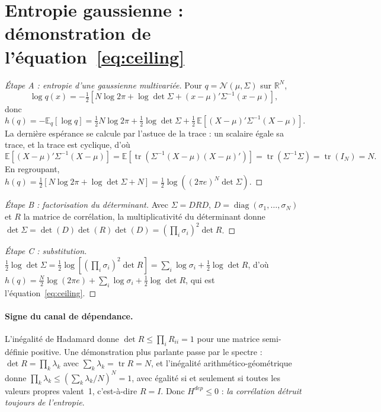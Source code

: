 \documentclass[11pt]{article}
\theoremstyle{definition}
\theoremstyle{remark}
\begin{document}
\section{Entropie gaussienne : démonstration de l'équation~\eqref{eq:ceiling}}
\label{app:gauss}

\begin{proof}[Étape A : entropie d'une gaussienne multivariée]
Pour $q=\mathcal N(\mu,\Sigma)$ sur $\mathbb{R}^N$,
\[
\log q(x) = -\tfrac12\left[N\log 2\pi + \log\det\Sigma + (x-\mu)'\Sigma^{-1}(x-\mu)\right],
\]
donc
\[
h(q) = -\mathbb{E}_q[\log q] = \tfrac12 N\log 2\pi + \tfrac12\log\det\Sigma
+ \tfrac12\,\mathbb{E}\!\left[(X-\mu)'\Sigma^{-1}(X-\mu)\right].
\]
La dernière espérance se calcule par l'astuce de la trace : un scalaire égale sa
trace, et la trace est cyclique, d'où
\[
\mathbb{E}\!\left[(X-\mu)'\Sigma^{-1}(X-\mu)\right]
= \mathbb{E}\!\left[\operatorname{tr}\!\left(\Sigma^{-1}(X-\mu)(X-\mu)'\right)\right]
= \operatorname{tr}(\Sigma^{-1}\Sigma) = \operatorname{tr}(I_N) = N .
\]
En regroupant, $h(q)=\tfrac12\left[N\log2\pi+\log\det\Sigma+N\right]
=\tfrac12\log\!\left((2\pi e)^N\det\Sigma\right)$.
\end{proof}

\begin{proof}[Étape B : factorisation du déterminant]
Avec $\Sigma=DRD$, $D=\operatorname{diag}(\sigma_1,\dots,\sigma_N)$ et $R$ la
matrice de corrélation, la multiplicativité du déterminant donne
$\det\Sigma=\det(D)\det(R)\det(D)=\left(\prod_i\sigma_i\right)^2\det R$.
\end{proof}

\begin{proof}[Étape C : substitution]
$\tfrac12\log\det\Sigma
=\tfrac12\log\!\left[\left(\prod_i\sigma_i\right)^2\det R\right]
=\sum_i\log\sigma_i+\tfrac12\log\det R$, d'où
$h(q)=\tfrac N2\log(2\pi e)+\sum_i\log\sigma_i+\tfrac12\log\det R$, qui est
l'équation~\eqref{eq:ceiling}.
\end{proof}

\paragraph{Signe du canal de dépendance.} L'inégalité de Hadamard donne
$\det R\le\prod_i R_{ii}=1$ pour une matrice semi-définie positive. Une
démonstration plus parlante passe par le spectre : $\det R=\prod_k\lambda_k$
avec $\sum_k\lambda_k=\operatorname{tr}R=N$, et l'inégalité arithmético-géométrique
donne $\prod_k\lambda_k\le\left(\sum_k\lambda_k/N\right)^N=1$, avec égalité si
et seulement si toutes les valeurs propres valent~1, c'est-à-dire $R=I$. Donc
$H^{dep}\le0$ : \emph{la corrélation détruit toujours de l'entropie}.
\end{document}
